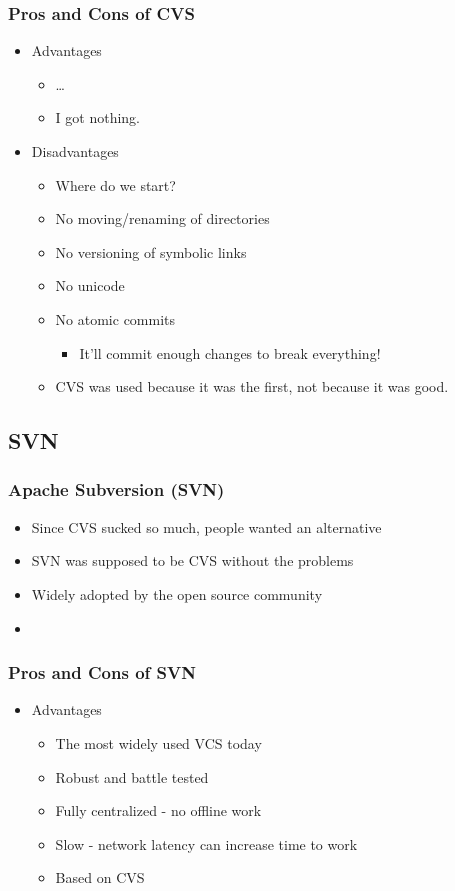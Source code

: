 \documentclass{beamer}
\begin{document}
\begin{frame}
    \frametitle{Pros and Cons of CVS}
    \begin{itemize}
	\item Advantages
	\begin{itemize}
	    \item \ldots
	    \item I got nothing.
	\end{itemize}
    \item Disadvantages
	\begin{itemize}
	    \item Where do we start?
	    \item No moving/renaming of directories
	    \item No versioning of symbolic links
	    \item No unicode
	    \item No atomic commits 
	    \begin{itemize}
		\item It'll commit enough changes to break everything!
	    \end{itemize}
	    \item CVS was used because it was the first, not because it was good.
	\end{itemize}
    \end{itemize}
\end{frame}

\subsection{SVN}

\begin{frame}
    \frametitle{Apache Subversion (SVN)}
    \begin{itemize}
	\item Since CVS sucked so much, people wanted an alternative
	\item SVN was supposed to be CVS without the problems
	\item Widely adopted by the open source community
	\item
    \end{itemize}
\end{frame}

\begin{frame}
    \frametitle{Pros and Cons of SVN}
    \begin{itemize}
	\item Advantages
	\begin{itemize}
	    \item The most widely used VCS today
	    \item Robust and battle tested
	\end{itemize}
	\begin{itemize}
	    \item Fully centralized - no offline work
	    \item Slow - network latency can increase time to work
	    \item Based on CVS
	\end{itemize}
    \end{itemize}
\end{frame}
\end{document}
